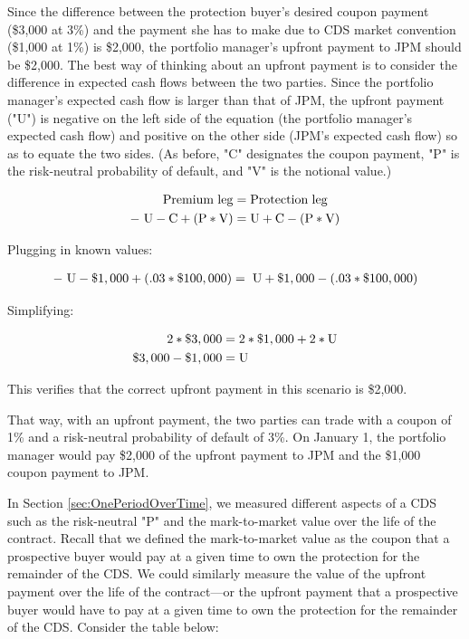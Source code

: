 \documentclass[article]{jss}
\begin{document}
Since the difference between the protection buyer's desired coupon payment (\$3,000 at 3\%) and the payment she has to make due to CDS market convention (\$1,000 at 1\%) is \$2,000, the portfolio manager's upfront payment to JPM should be \$2,000. The best way of thinking about an upfront payment is to consider the difference in expected cash flows between the two parties. Since the portfolio manager's expected cash flow is larger than that of JPM, the upfront payment ("U") is negative on the left side of the equation (the portfolio manager's expected cash flow) and positive on the other side (JPM's expected cash flow) so as to equate the two sides. (As before, "C" designates the coupon payment, "P" is the risk-neutral probability of default, and "V" is the notional value.)

\label{eqn:Upfront}
\begin{align}
   \rm Premium\hspace{3pt}leg &= \rm Protection\hspace{3pt}leg \\
   \rm -\hspace{3pt}U - C + (P * V) &= \rm U + C - (P * V)
\end{align}

Plugging in known values:

\begin{equation}
 \begin{aligned}
   {\rm -\hspace{3pt}U - \$1,000 + (.03 * \$100,000) = \hspace{3pt}U + \$1,000 - (.03 * \$100,000)}
    \end{aligned}
\end{equation}

Simplifying:


\begin{align}
   \rm 2 * \$3,000 &= \rm 2 * \$1,000 + 2 * U \\
   \rm \$3,000 - \$1,000 &= \rm U
\end{align}

This verifies that the correct upfront payment in this scenario is \$2,000. 

That way, with an upfront payment, the two parties can trade with a coupon of 1\% and a risk-neutral probability of default of 3\%. On January 1, the portfolio manager would pay \$2,000 of the upfront payment to JPM and the \$1,000 coupon payment to JPM.

In Section \ref{sec:OnePeriodOverTime}, we measured different aspects of a CDS such as the risk-neutral "P" and the mark-to-market value over the life of the contract. Recall that we defined the mark-to-market value as the coupon that a prospective buyer would pay at a given time to own the protection for the remainder of the CDS. We could similarly measure the value of the upfront payment over the life of the contract---or the upfront payment that a prospective buyer would have to pay at a given time to own the protection for the remainder of the CDS. Consider the table below:
\end{document}
